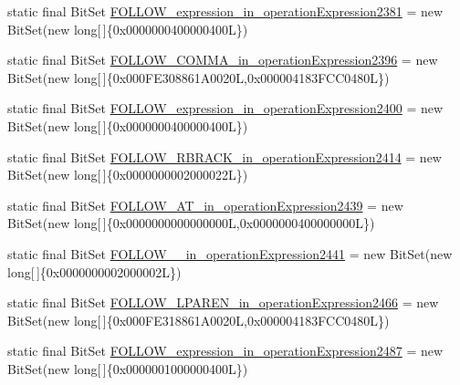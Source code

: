 \begin{DoxyCompactItemize}
\item 
static final Bit\-Set \hyperlink{classorg_1_1tzi_1_1use_1_1parser_1_1testsuite_1_1_test_suite_parser_a1448700a9e83578f902b2cc4a05dd675}{F\-O\-L\-L\-O\-W\-\_\-expression\-\_\-in\-\_\-operation\-Expression2381} = new Bit\-Set(new long\mbox{[}$\,$\mbox{]}\{0x0000000400000400\-L\})
\item 
static final Bit\-Set \hyperlink{classorg_1_1tzi_1_1use_1_1parser_1_1testsuite_1_1_test_suite_parser_aca89ecbe82e9abc3c4fe51426c41dc01}{F\-O\-L\-L\-O\-W\-\_\-\-C\-O\-M\-M\-A\-\_\-in\-\_\-operation\-Expression2396} = new Bit\-Set(new long\mbox{[}$\,$\mbox{]}\{0x000\-F\-E308861\-A0020\-L,0x000004183\-F\-C\-C0480\-L\})
\item 
static final Bit\-Set \hyperlink{classorg_1_1tzi_1_1use_1_1parser_1_1testsuite_1_1_test_suite_parser_ae98f8110a1d0fdb53e21d86c1bdf8c91}{F\-O\-L\-L\-O\-W\-\_\-expression\-\_\-in\-\_\-operation\-Expression2400} = new Bit\-Set(new long\mbox{[}$\,$\mbox{]}\{0x0000000400000400\-L\})
\item 
static final Bit\-Set \hyperlink{classorg_1_1tzi_1_1use_1_1parser_1_1testsuite_1_1_test_suite_parser_a2f1c70c6d4152433328f95a321b9687b}{F\-O\-L\-L\-O\-W\-\_\-\-R\-B\-R\-A\-C\-K\-\_\-in\-\_\-operation\-Expression2414} = new Bit\-Set(new long\mbox{[}$\,$\mbox{]}\{0x0000000002000022\-L\})
\item 
static final Bit\-Set \hyperlink{classorg_1_1tzi_1_1use_1_1parser_1_1testsuite_1_1_test_suite_parser_a2228d5f91c37b322c85ecc49c396069b}{F\-O\-L\-L\-O\-W\-\_\-\-A\-T\-\_\-in\-\_\-operation\-Expression2439} = new Bit\-Set(new long\mbox{[}$\,$\mbox{]}\{0x0000000000000000\-L,0x0000000400000000\-L\})
\item 
static final Bit\-Set \hyperlink{classorg_1_1tzi_1_1use_1_1parser_1_1testsuite_1_1_test_suite_parser_a361134689a68b755901345c98c25d82d}{F\-O\-L\-L\-O\-W\-\_\-\_\-in\-\_\-operation\-Expression2441} = new Bit\-Set(new long\mbox{[}$\,$\mbox{]}\{0x0000000002000002\-L\})
\item 
static final Bit\-Set \hyperlink{classorg_1_1tzi_1_1use_1_1parser_1_1testsuite_1_1_test_suite_parser_a5bdb16f549310e3964dd29cc31b2ef8a}{F\-O\-L\-L\-O\-W\-\_\-\-L\-P\-A\-R\-E\-N\-\_\-in\-\_\-operation\-Expression2466} = new Bit\-Set(new long\mbox{[}$\,$\mbox{]}\{0x000\-F\-E318861\-A0020\-L,0x000004183\-F\-C\-C0480\-L\})
\item 
static final Bit\-Set \hyperlink{classorg_1_1tzi_1_1use_1_1parser_1_1testsuite_1_1_test_suite_parser_a154ae661ea52fc6fc184e1e6ce4b2a47}{F\-O\-L\-L\-O\-W\-\_\-expression\-\_\-in\-\_\-operation\-Expression2487} = new Bit\-Set(new long\mbox{[}$\,$\mbox{]}\{0x0000001000000400\-L\})

\end{DoxyCompactItemize}
